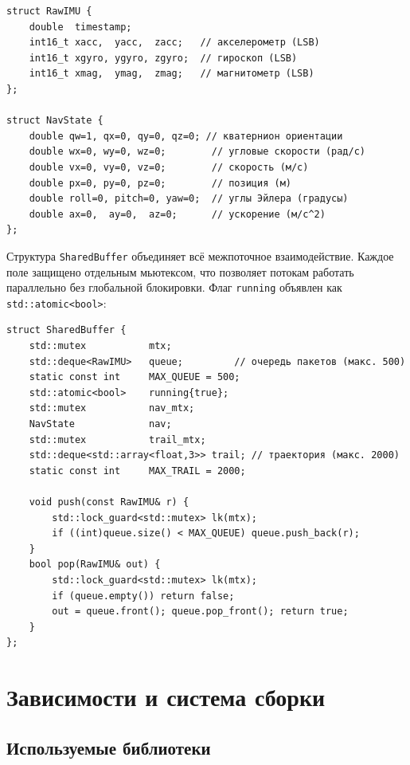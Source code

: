 \begin{lstlisting}[caption={Структуры RawIMU и NavState}]
struct RawIMU {
    double  timestamp;
    int16_t xacc,  yacc,  zacc;   // акселерометр (LSB)
    int16_t xgyro, ygyro, zgyro;  // гироскоп (LSB)
    int16_t xmag,  ymag,  zmag;   // магнитометр (LSB)
};
 
struct NavState {
    double qw=1, qx=0, qy=0, qz=0; // кватернион ориентации
    double wx=0, wy=0, wz=0;        // угловые скорости (рад/с)
    double vx=0, vy=0, vz=0;        // скорость (м/с)
    double px=0, py=0, pz=0;        // позиция (м)
    double roll=0, pitch=0, yaw=0;  // углы Эйлера (градусы)
    double ax=0,  ay=0,  az=0;      // ускорение (м/с^2)
};
\end{lstlisting}
 
Структура \texttt{SharedBuffer} объединяет всё межпоточное взаимодействие.
Каждое поле защищено отдельным мьютексом, что позволяет потокам работать
параллельно без глобальной блокировки. Флаг \texttt{running} объявлен как
\texttt{std::atomic<bool>}:
 
\begin{lstlisting}[caption={Потокобезопасный разделяемый буфер}]
struct SharedBuffer {
    std::mutex           mtx;
    std::deque<RawIMU>   queue;         // очередь пакетов (макс. 500)
    static const int     MAX_QUEUE = 500;
    std::atomic<bool>    running{true};
    std::mutex           nav_mtx;
    NavState             nav;
    std::mutex           trail_mtx;
    std::deque<std::array<float,3>> trail; // траектория (макс. 2000)
    static const int     MAX_TRAIL = 2000;
 
    void push(const RawIMU& r) {
        std::lock_guard<std::mutex> lk(mtx);
        if ((int)queue.size() < MAX_QUEUE) queue.push_back(r);
    }
    bool pop(RawIMU& out) {
        std::lock_guard<std::mutex> lk(mtx);
        if (queue.empty()) return false;
        out = queue.front(); queue.pop_front(); return true;
    }
};
\end{lstlisting}
 
\newpage
 
\section{Зависимости и система сборки}
 
\subsection{Используемые библиотеки}
 
